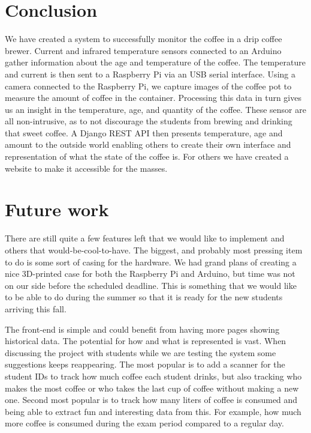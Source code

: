 \documentclass[12pt,a4paper,oneside,article]{memoir}
\numberwithin{equation}{chapter}
\begin{document}
\section{Conclusion}\label{sec:conclusion}
We have created a system to successfully monitor the coffee in a drip coffee 
brewer. Current and infrared temperature sensors connected to an Arduino 
gather information about the age and temperature of the coffee. The 
temperature and current is then sent to a Raspberry Pi via an USB serial
interface. Using a camera connected to the Raspberry Pi, we capture images of 
the coffee pot to measure the amount of coffee in the container. Processing 
this data in turn gives us an insight in the temperature, age, and quantity of 
the coffee. These sensor are all non-intrusive, as to not discourage the 
students from brewing and drinking that sweet coffee. A Django REST API then 
presents temperature, age and amount to the outside world enabling others to 
create their own interface and representation of what the state of the coffee 
is. For others we have created a website to make it accessible for the masses.
 
\section{Future work}\label{sec:future-work}
There are still quite a few features left that we would like to implement and 
others that would-be-cool-to-have. The biggest, and probably most pressing 
item to do is some sort of casing for the hardware. We had grand plans of 
creating a nice 3D-printed case for both the Raspberry Pi and Arduino, but time 
was not on our side before the scheduled deadline. This is something that we 
would like to be able to do during the summer so that it is ready for the new 
students arriving this fall.

The front-end is simple and could benefit from having more pages showing
historical data. The potential for how and what is represented is vast. When 
discussing the project with students while we are testing the system some
suggestions keeps reappearing. The most popular is to add a scanner for 
the student IDs to track how much coffee each student drinks, but also tracking 
who makes the most coffee or who takes the last cup of coffee without making a 
new one. Second most popular is to track how many liters of coffee is 
consumed and being able to extract fun and interesting data from this. For 
example, how much more coffee is consumed during the exam period compared to a 
regular day.
\end{document}
